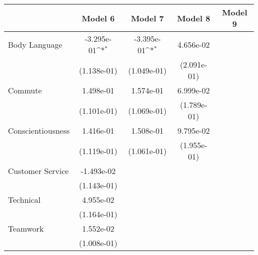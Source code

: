 
{
\def\sym#1{\ifmmode^{#1}\else\(^{#1}\)\fi}
\begin{tabular}{l*{4}{c}}
    \toprule
                          & \multicolumn{1}{c}{Model 6} & \multicolumn{1}{c}{Model 7} & \multicolumn{1}{c}{Model 8} & \multicolumn{1}{c}{Model 9} \\
    \midrule
    Body Language         & -3.295e-01\sym{*}           & -3.395e-01\sym{*}           & 4.656e-02                   &                             \\
                          & (1.138e-01)                 & (1.049e-01)                 & (2.091e-01)                 &                             \\
    \addlinespace
    Commute               & 1.498e-01                   & 1.574e-01                   & 6.999e-02                   &                             \\
                          & (1.101e-01)                 & (1.069e-01)                 & (1.789e-01)                 &                             \\
    \addlinespace
    Conscientiousness     & 1.416e-01                   & 1.508e-01                   & 9.795e-02                   &                             \\
                          & (1.119e-01)                 & (1.061e-01)                 & (1.955e-01)                 &                             \\
    \addlinespace
    Customer Service      & -1.493e-02                  &                             &                             &                             \\
                          & (1.143e-01)                 &                             &                             &                             \\
    \addlinespace
    Technical             & 4.955e-02                   &                             &                             &                             \\
                          & (1.164e-01)                 &                             &                             &                             \\
    \addlinespace
    Teamwork              & 1.552e-02                   &                             &                             &                             \\
                          & (1.008e-01)                 &                             &                             &                             \\

\end{tabular}}

